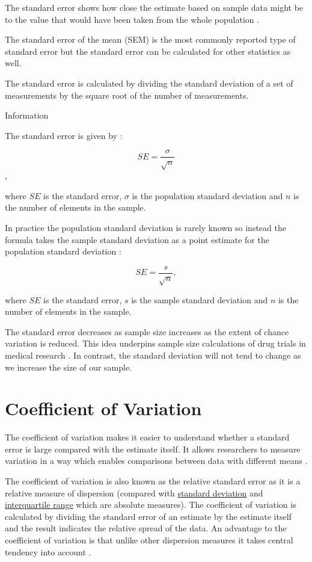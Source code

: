\documentclass[
]{book}
\begin{document}
The standard error shows how close the estimate based on sample data might be to the value that would have been taken from the whole population \citep{uncertainty}.

The standard error of the mean (SEM) is the most commonly reported type of standard error but the standard error can be calculated for other statistics as well.

The standard error is calculated by dividing the standard deviation of a set of measurements by the square root of the number of measurements.

Information

The standard error is given by \citep{uncertainty}:

\[SE=\frac{\sigma}{\sqrt{n}}\],

where \(SE\) is the standard error, \(\sigma\) is the population standard deviation and \(n\) is the number of elements in the sample.

In practice the population standard deviation is rarely known so instead the formula takes the sample standard deviation as a point estimate for the population standard deviation \citep{uncertainty}:

\[SE=\frac{s}{\sqrt{n}},\]

where \(SE\) is the standard error, \(s\) is the sample standard deviation and \(n\) is the number of elements in the sample.

The standard error decreases as sample size increases as the extent of chance variation is reduced. This idea underpins sample size calculations of drug trials in medical research \citep{bmj}. In contrast, the standard deviation will not tend to change as we increase the size of our sample.

\hypertarget{coeff}{%
\section{Coefficient of Variation}\label{coeff}}

The coefficient of variation makes it easier to understand whether a standard error is large compared with the estimate itself. It allows researchers to measure variation in a way which enables comparisons between data with different means \citep{davidandgray}.

The coefficient of variation is also known as the relative standard error as it is a relative measure of dispersion (compared with \protect\hyperlink{stdv}{standard deviation} and \protect\hyperlink{iqr}{interquartile range} which are absolute measures). The coefficient of variation is calculated by dividing the standard error of an estimate by the estimate itself and the result indicates the relative spread of the data. An advantage to the coefficient of variation is that unlike other dispersion measures it takes central tendency into account \citep{davidandgray}.
\end{document}
